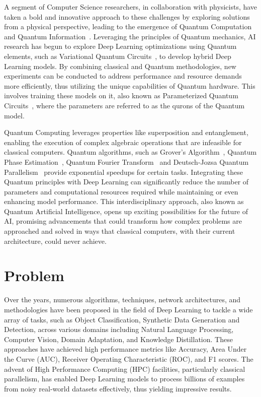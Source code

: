 \documentclass[12pt,a4paper]{report}
\begin{document}
A segment of Computer Science researchers, in collaboration with physicists, have taken a bold and innovative approach to these challenges by exploring solutions from a physical perspective, leading to the emergence of Quantum Computation and Quantum Information~\cite{nielsen2001quantum}. Leveraging the principles of Quantum mechanics, AI research has begun to explore Deep Learning optimizations using Quantum elements, such as Variational Quantum Circuits~\cite{cerezo2021variational}, to develop hybrid Deep Learning models. By combining classical and Quantum methodologies, new experiments can be conducted to address performance and resource demands more efficiently, thus utilizing the unique capabilities of Quantum hardware. This involves training these models on it, also known as Parameterized Quantum Circuits~\cite{benedetti2019parameterized}, where the parameters are referred to as the qurons of the Quantum model.

Quantum Computing leverages properties like superposition and entanglement, enabling the execution of complex algebraic operations that are infeasible for classical computers. Quantum algorithms, such as Grover's Algorithm~\cite{shi2017coherence}, Quantum Phase Estimation~\cite{o2019quantum}, Quantum Fourier Transform~\cite{weinstein2001implementation} and Deutsch-Jozsa Quantum Parallelism~\cite{gulde2003implementation} provide exponential speedups for certain tasks. Integrating these Quantum principles with Deep Learning can significantly reduce the number of parameters and computational resources required while maintaining or even enhancing model performance. This interdisciplinary approach, also known as Quantum Artificial Intelligence, opens up exciting possibilities for the future of AI, promising advancements that could transform how complex problems are approached and solved in ways that classical computers, with their current architecture, could never achieve.
\section{Problem}\vspace{-12pt}
Over the years, numerous algorithms, techniques, network architectures, and methodologies have been proposed in the field of Deep Learning to tackle a wide array of tasks, such as Object Classification, Synthetic Data Generation and Detection, across various domains including Natural Language Processing, Computer Vision, Domain Adaptation, and Knowledge Distillation. These approaches have achieved high performance metrics like Accuracy, Area Under the Curve (AUC), Receiver Operating Characteristic (ROC), and F1 scores. The advent of High Performance Computing (HPC) facilities, particularly classical parallelism, has enabled Deep Learning models to process billions of examples from noisy real-world datasets effectively, thus yielding impressive results.
\end{document}
